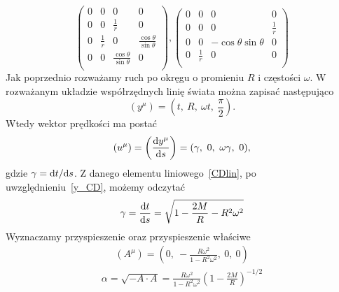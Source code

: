 $$
\left(
\begin{array}{cccc}
 0 & 0 & 0 & 0 \\
 0 & 0 & \frac{1}{r} & 0 \\
 0 & \frac{1}{r} & 0 & \frac{\cos \theta}{\sin\theta}  \\
 0 & 0 &\frac{ \cos \theta }{\sin \theta }  & 0 \\
\end{array}
\right),\left(
\begin{array}{cccc}
 0 & 0 & 0 & 0 \\
 0 & 0 & 0 & \frac{1}{r} \\
 0 & 0 & -\cos \theta\sin \theta  & 0 \\
 0 & \frac{1}{r} & 0 & 0 \\
\end{array}
\right)
$$
Jak poprzednio rozważamy ruch po okręgu o promieniu $R$ i częstości $\omega$.
W rozważanym układzie współrzędnych linię świata można zapisać następująco
\begin{equation}\label{y_CD}
(y^\mu) = \left( t,\ R,\ \omega t,\ \frac{\pi}{2}\right).
\end{equation}
Wtedy wektor prędkości ma postać
\begin{equation}\nonumber
(u^\mu) = \left( \frac{\text{d} y^\mu}{\text{d} s} \right) 
= (\gamma,\ 0,\ \omega\gamma,\ 0),
\end{equation}
gdzie $\gamma = \text{d} t/\text{d} s$. Z danego elementu liniowego~\eqref{CDlin}, 
po uwzględnieniu~\eqref{y_CD}, możemy odczytać 
\begin{align}\nonumber
\gamma = \frac{\text{d} t}{\text{d} s} = 
\sqrt{ 1 - \frac{2 M}{R} - R^2\omega^2 }
\end{align}
Wyznaczamy przyspieszenie oraz przyspieszenie właściwe
\begin{align}\nonumber
(A^\mu) = \left(0,\ -\frac{R\omega^2}{1-R^2\omega^2},\ 0,\ 0 \right)
\end{align}
\begin{align}\nonumber
\alpha = \sqrt{-A\cdot A} = \frac{R\omega^2}{1-R^2\omega^2} 
\left( 1-\frac{2M}{R} \right)^{-1/2}
\end{align}

